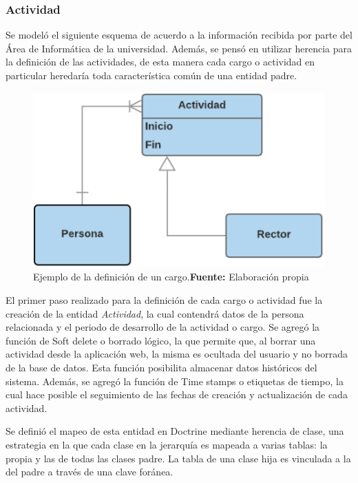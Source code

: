 \subsubsection{Actividad}%
\label{ssub:actividad}
Se modeló el siguiente esquema de acuerdo a la información recibida por parte del Área de Informática de la universidad\@.
Además, se pensó en utilizar herencia para la definición de las actividades, de esta manera cada cargo o actividad en particular
heredaría toda característica común de una entidad padre.

\begin{figure}[H]
    \includegraphics[scale=1]{image/actividad-modelo.png}
    \caption[Ejemplo de la definición de un cargo]{Ejemplo de la definición de un cargo.\newline \textbf{Fuente:} Elaboración propia}%
    \label{fig:image/actividad-modelo}
\end{figure}
El primer paso realizado para la definición de cada cargo o actividad fue la creación de la entidad \textit{Actividad}, la cual contendrá
datos de la persona relacionada y el periodo de desarrollo de la actividad o cargo\@.
Se agregó la función de Soft delete o borrado lógico, la que permite que, al borrar una actividad desde la aplicación web,
la misma es ocultada del usuario y no borrada de la base de datos\@. Esta función posibilita almacenar datos históricos del sistema\@.
Además, se agregó la función de Time stamps o etiquetas de tiempo, la cual hace posible el seguimiento de las fechas de creación
y actualización de cada actividad.


Se definió el mapeo de esta entidad en Doctrine mediante herencia de clase, una estrategia en la que cada clase en la jerarquía es mapeada a varias tablas:
la propia y las de todas las clases padre. La tabla de una clase hija es vinculada a la del padre a través de una clave foránea.

